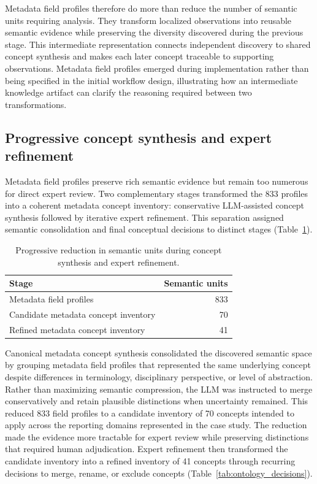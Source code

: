 \documentclass{article}
\begin{document}
Metadata field profiles therefore do more than reduce the number of semantic units requiring analysis. They transform localized observations into reusable semantic evidence while preserving the diversity discovered during the previous stage. This intermediate representation connects independent discovery to shared concept synthesis and makes each later concept traceable to supporting observations. Metadata field profiles emerged during implementation rather than being specified in the initial workflow design, illustrating how an intermediate knowledge artifact can clarify the reasoning required between two transformations.

\subsection{Progressive concept synthesis and expert refinement}

Metadata field profiles preserve rich semantic evidence but remain too numerous for direct expert review. Two complementary stages transformed the 833 profiles into a coherent metadata concept inventory: conservative LLM-assisted concept synthesis followed by iterative expert refinement. This separation assigned semantic consolidation and final conceptual decisions to distinct stages (Table~\ref{tab:ontology_progression}).

\begin{table}[!ht]
    \centering
    \caption{Progressive reduction in semantic units during concept synthesis and expert refinement.}
    \label{tab:ontology_progression}
    \begin{tabular}{lr}
    \toprule
        \textbf{Stage} & \textbf{Semantic units} \\
        \midrule
        Metadata field profiles & 833 \\
        Candidate metadata concept inventory & 70 \\
        Refined metadata concept inventory & 41 \\
    \bottomrule
    \end{tabular}
\end{table}

Canonical metadata concept synthesis consolidated the discovered semantic space by grouping metadata field profiles that represented the same underlying concept despite differences in terminology, disciplinary perspective, or level of abstraction. Rather than maximizing semantic compression, the LLM was instructed to merge conservatively and retain plausible distinctions when uncertainty remained. This reduced 833 field profiles to a candidate inventory of 70 concepts intended to apply across the reporting domains represented in the case study. The reduction made the evidence more tractable for expert review while preserving distinctions that required human adjudication. Expert refinement then transformed the candidate inventory into a refined inventory of 41 concepts through recurring decisions to merge, rename, or exclude concepts (Table~\ref{tab:ontology_decisions}).
\end{document}
